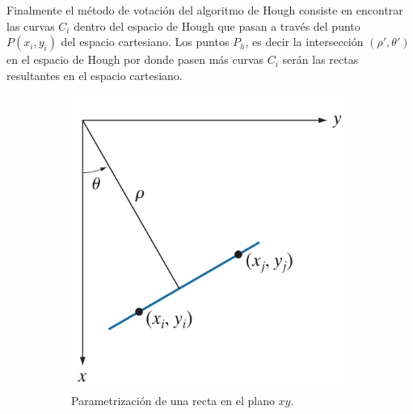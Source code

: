 Finalmente el método de votación del algoritmo de Hough consiste en encontrar las curvas $C_i$ dentro del espacio de Hough que pasan a través del punto $P(x_i, y_i)$ del espacio cartesiano. Los puntos $P_h$, es decir la intersección $(\rho ', \theta')$ en el espacio de Hough por donde pasen más curvas $C_i$ serán las rectas resultantes en el espacio cartesiano.
\begin{figure}
    \centering
    \begin{subfigure}[b]{0.4\textwidth}
         \centering
         \includegraphics[width=\textwidth]{Figures/Figures_Cap04/cartesian_space.png}
         \caption{Parametrización de una recta en el plano $xy$.}
         \label{fig:cartesian_space}
    \end{subfigure}
    \hfill
    \begin{subfigure}[b]{0.42\textwidth}
         \centering

\end{subfigure}
\end{figure}
